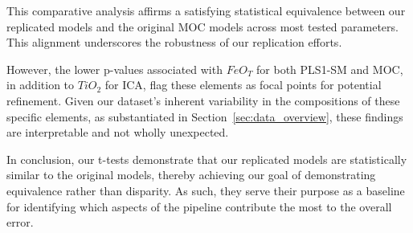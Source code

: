 This comparative analysis affirms a satisfying statistical equivalence between our replicated models and the original MOC models across most tested parameters.
This alignment underscores the robustness of our replication efforts.

However, the lower p-values associated with $FeO_T$ for both PLS1-SM and MOC, in addition to $TiO_2$ for ICA, flag these elements as focal points for potential refinement.
Given our dataset's inherent variability in the compositions of these specific elements, as substantiated in Section~\ref{sec:data_overview}, these findings are interpretable and not wholly unexpected.

In conclusion, our t-tests demonstrate that our replicated models are statistically similar to the original models, thereby achieving our goal of demonstrating equivalence rather than disparity.
As such, they serve their purpose as a baseline for identifying which aspects of the pipeline contribute the most to the overall error.

